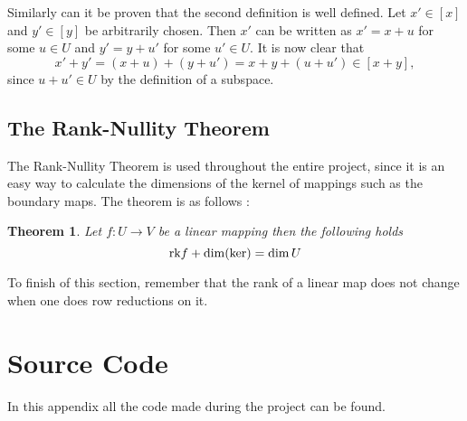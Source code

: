 \documentclass[11pt,a4paper,twoside]{report}
\newtheorem{mythm}{Theorem}[chapter]
\begin{document}
Similarly can it be proven that the second definition is well defined. Let $x'\in[x]$ and $y'\in [y]$ be arbitrarily chosen. Then $x'$ can be written as $x'=x+u$ for some $u\in U$ and $y' = y+u'$ for some $u'\in U$. It is now clear that
\begin{equation*}
x'+y'=(x+u)+(y+u')=x+y+(u+u')\in [x+y],
\end{equation*}
since $u+u'\in U$ by the definition of a subspace.


\section{The Rank-Nullity Theorem}
The Rank-Nullity Theorem is used throughout the entire project, since it is an easy way to calculate the dimensions of the kernel of mappings such as the boundary maps. The theorem is as follows \cite[p. 109]{LinAlg}: 
\begin{mythm}\label{thm:rank_nullity}
Let $f:U\to V$ be a linear mapping then the following holds
\begin{equation*}
\textnormal{rk}f+\dim(\ker)=\dim U
\end{equation*}
\end{mythm}

To finish of this section, remember that the rank of a linear map does not change when one does row reductions on it.

\chapter{Source Code}\label{ch:source_code}
In this appendix all the code made during the project can be found.










\end{document}
